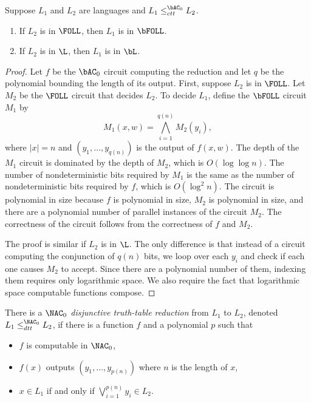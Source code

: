 \documentclass{article}
\begin{document}
\begin{lemma}\label{lem:ctt}
  Suppose $L_1$ and $L_2$ are languages and $L_1 \leq^{\bAC_0}_{ctt} L_2$.
  \begin{enumerate}
  \item If $L_2$ is in $\FOLL$, then $L_1$ is in $\bFOLL$.
  \item If $L_2$ is in $\L$, then $L_1$ is in $\bL$.
  \end{enumerate}
\end{lemma}
\begin{proof}
  Let $f$ be the $\bAC_0$ circuit computing the reduction and let $q$ be the polynomial bounding the length of its output.
  First, suppose $L_2$ is in $\FOLL$.
  Let $M_2$ be the $\FOLL$ circuit that decides $L_2$.
  To decide $L_1$, define the $\bFOLL$ circuit $M_1$ by
  \begin{equation*}
    M_1(x, w) = \bigwedge_{i = 1}^{q(n)} M_2(y_i),
  \end{equation*}
  where $|x| = n$ and $(y_1, \dotsc, y_{q(n)})$ is the output of $f(x, w)$.
  The depth of the $M_1$ circuit is dominated by the depth of $M_2$, which is $O(\log \log n)$.
  The number of nondeterministic bits required by $M_1$ is the same as the number of nondeterministic bits required by $f$, which is $O(\log^2 n)$.
  The circuit is polynomial in size because $f$ is polynomial in size, $M_2$ is polynomial in size, and there are a polynomial number of parallel instances of the circuit $M_2$.
  The correctness of the circuit follows from the correctness of $f$ and $M_2$.

  The proof is similar if $L_2$ is in $\L$.
  The only difference is that instead of a circuit computing the conjunction of $q(n)$ bits, we loop over each $y_i$ and check if each one causes $M_2$ to accept.
  Since there are a polynomial number of them, indexing them requires only logarithmic space.
  We also require the fact that logarithmic space computable functions compose.
\end{proof}

There is a \emph{$\NAC_0$ disjunctive truth-table reduction} from $L_1$ to $L_2$, denoted $L_1 \leq^{\NAC_0}_{dtt} L_2$, if there is a function $f$ and a polynomial $p$ such that
\begin{itemize}
\item $f$ is computable in $\NAC_0$,
\item $f(x)$ outputs $(y_1, \dotsc, y_{p(n)})$ where $n$ is the length of $x$,
\item $x \in L_1$ if and only if $\bigvee_{i = 1}^{p(n)} y_i \in L_2$.
\end{itemize}
\end{document}

